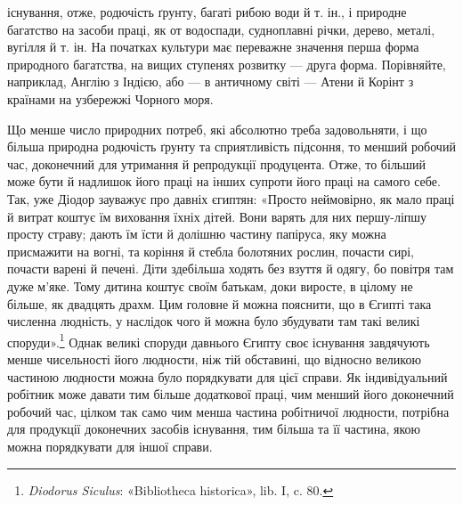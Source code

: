 \parcont{}  %
існування, отже, родючість ґрунту, багаті рибою води й т. ін.,
і природне багатство на засоби праці, як от водоспади, судноплавні
річки, дерево, металі, вугілля й т. ін. На початках культури
має переважне значення перша форма природного багатства,
на вищих ступенях розвитку — друга форма. Порівняйте,
наприклад, Англію з Індією, або — в античному світі — Атени
й Корінт з країнами на узбережжі Чорного моря.

Що менше число природних потреб, які абсолютно треба
задовольняти, і що більша природна родючість ґрунту та сприятливість
підсоння, то менший робочий час, доконечний для утримання
й репродукції продуцента. Отже, то більший може бути й
надлишок його праці на інших супроти його праці на самого себе.
Так, уже Діодор зауважує про давніх єгиптян: «Просто неймовірно,
як мало праці й витрат коштує їм виховання їхніх дітей.
Вони варять для них першу-ліпшу просту страву; дають їм
їсти й долішню частину папіруса, яку можна присмажити на
вогні, та коріння й стебла болотяних рослин, почасти сирі, почасти
варені й печені. Діти здебільша ходять без взуття й одягу,
бо повітря там дуже м’яке. Тому дитина коштує своїм батькам,
доки виросте, в цілому не більше, як двадцять драхм. Цим головне
й можна пояснити, що в Єгипті така численна людність,
у наслідок чого й можна було збудувати там такі великі споруди».\footnote{
\emph{Diodorus Siculus}: «Bibliotheca historica», lib. I, c. 80.
}
Однак великі споруди давнього Єгипту своє існування
завдячують менше чисельності його людности, ніж тій обставині,
що відносно великою частиною людности можна було порядкувати
для цієї справи. Як індивідуальний робітник може давати
тим більше додаткової праці, чим менший його доконечний робочий
час, цілком так само чим менша частина робітничої людности,
потрібна для продукції доконечних засобів існування,
тим більша та її частина, якою можна порядкувати для іншої
справи.

